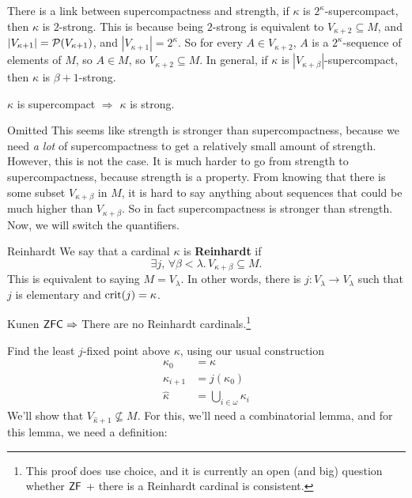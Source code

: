 \documentclass{article}
\begin{document}
\begin{remark*}
    There is a link between supercompactness and strength, if $\kappa$ is $2^{\kappa}$-supercompact, then $\kappa$ is $2$-strong. This is because being $2$-strong is equivalent to $V_{\kappa+2} \subseteq M$, and $|V_{\kappa+1}| = \mathcal{P}(V_{\kappa+1})$, and $|V_{\kappa+1}| = 2^{\kappa}$. So for every $A \in V_{\kappa+2}$, $A$ is a $2^{\kappa}$-sequence of elements of $M$, so $A \in M$, so $V_{\kappa+2} \subseteq M$. \gap 
    In general, if $\kappa$ is $|V_{\kappa+\beta}|$-supercompact, then $\kappa$ is $\beta+1$-strong.
\end{remark*}
\begin{corr}{}
    $\kappa$ is supercompact $\Rightarrow$ $\kappa$ is strong.
\end{corr}
\proof Omitted \endproof 
This seems like strength is stronger than supercompactness, because we need \textit{a lot} of supercompactness to get a relatively small amount of strength. However, this is not the case. It is much harder to go from strength to supercompactness, because strength is a  property. From knowing that there is some subset $V_{\kappa+\beta}$ in $M$, it is hard to say anything about sequences that could be much higher than $V_{\kappa+\beta}$. So in fact supercompactness is stronger than strength.
\gap 
Now, we will switch the quantifiers.
\begin{fancydefine}{Reinhardt}
    We say that a cardinal $\kappa$ is \textbf{Reinhardt} if \[\exists j, \, \forall \beta < \lambda. \,V_{\kappa+\beta} \subseteq M.\]
    This is equivalent to saying $M = V_{\lambda}$. \gap 
    In other words, there is $j : V_{\lambda} \to V_{\lambda}$ such that $j$ is elementary and $\operatorname{crit}(j)=\kappa$.
\end{fancydefine}
\begin{fancythm}{Kunen}
    $\mathsf{ZFC} \Rightarrow$ There are no Reinhardt cardinals.\footnote{This proof does use choice, and it is currently an open (and big) question whether $\mathsf{ZF}$ + there is a Reinhardt cardinal is consistent.}
\end{fancythm}
\proof Find the least $j$-fixed point above $\kappa$, using our usual construction \begin{align*}
    \kappa_{0} &= \kappa\\
    \kappa_{i+1} &= j(\kappa_{0})\\
    \hat{\kappa} &= \bigcup_{i \in \omega} \kappa_{i}
\end{align*}
We'll show that $V_{\hat{\kappa}+1} \nsubseteq M$. For this, we'll need a combinatorial lemma, and for this lemma, we need a definition: 
\end{document}
